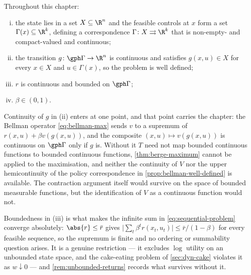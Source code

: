 \begin{assumption}\label{ass:dyn}
	Throughout this chapter:
	\begin{enumerate}[(i)]
		\item the state lies in a set $X\subseteq\R^{n}$ and the feasible controls at
		      $x$ form a set $\Gamma(x)\subseteq\R^{k}$, defining a correspondence
		      $\Gamma\colon X\rightrightarrows\R^{k}$ that is non-empty- and
		      compact-valued and continuous;
		\item the transition $g\colon\gph\Gamma\to\R^{n}$ is continuous and satisfies
		      $g(x,u)\in X$ for every $x\in X$ and $u\in\Gamma(x)$, so the problem is
		      well defined;
		\item $r$ is continuous and bounded on $\gph\Gamma$;
		\item $\beta\in(0,1)$.
	\end{enumerate}
\end{assumption}

Continuity of $g$ in (ii) enters at one point, and that point carries the
chapter: the Bellman operator
\eqref{eq:bellman-max} sends $v$ to a supremum of
$r(x,u)+\beta v(g(x,u))$, and the composite $(x,u)\mapsto v(g(x,u))$ is
continuous on $\gph\Gamma$ only if $g$ is. Without it $T$ need not map bounded
continuous functions to bounded continuous functions,
\autoref{thm:berge-maximum} cannot be applied to the maximisation, and neither
the continuity of $V$ nor the upper hemicontinuity of the policy correspondence
in \autoref{prop:bellman-well-defined} is available. The contraction argument itself would
survive on the space of bounded measurable functions, but the identification of
$V$ as a continuous function would not.

Boundedness in (iii) is what makes the infinite sum in
\eqref{eq:sequential-problem} converge absolutely: $\abs{r}\leq\bar r$ gives
$\bigl|\sum_t\beta^{t}r(x_t,u_t)\bigr|\leq\bar r/(1-\beta)$ for every feasible
sequence, so the supremum is finite and no ordering or summability question
arises. It is a genuine restriction --- it excludes $\log$ utility on an
unbounded state space, and the cake-eating problem of
\autoref{sec:dyn-cake} violates it as $w\downarrow0$ --- and
\autoref{rem:unbounded-returns} records what survives without it.

